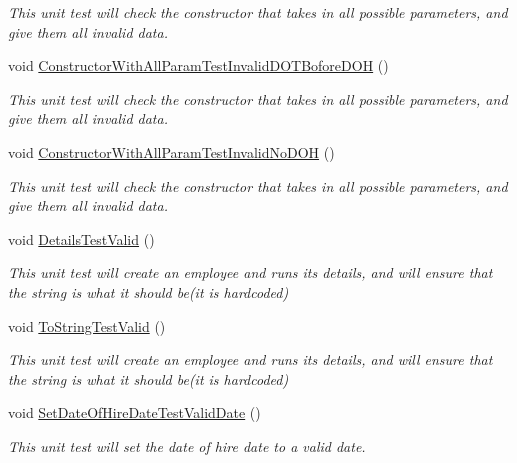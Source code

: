 \begin{DoxyCompactItemize}
\begin{DoxyCompactList}\small\item\em This unit test will check the constructor that takes in all possible parameters, and give them all invalid data. \end{DoxyCompactList}\item 
void \hyperlink{class_my_all_employee_1_1_tests_1_1_parttime_employee_tests_a36b5c50519f9866cab59de9204f00e91}{Constructor\+With\+All\+Param\+Test\+Invalid\+D\+O\+T\+Bofore\+D\+O\+H} ()
\begin{DoxyCompactList}\small\item\em This unit test will check the constructor that takes in all possible parameters, and give them all invalid data. \end{DoxyCompactList}\item 
void \hyperlink{class_my_all_employee_1_1_tests_1_1_parttime_employee_tests_acf0c1df829038c4ea3b2b4afd372bb48}{Constructor\+With\+All\+Param\+Test\+Invalid\+No\+D\+O\+H} ()
\begin{DoxyCompactList}\small\item\em This unit test will check the constructor that takes in all possible parameters, and give them all invalid data. \end{DoxyCompactList}\item 
void \hyperlink{class_my_all_employee_1_1_tests_1_1_parttime_employee_tests_a4c3a51bc9124ca9b76d227aa5a591e66}{Details\+Test\+Valid} ()
\begin{DoxyCompactList}\small\item\em This unit test will create an employee and runs it\textquotesingle{}s details, and will ensure that the string is what it should be(it is hardcoded) \end{DoxyCompactList}\item 
void \hyperlink{class_my_all_employee_1_1_tests_1_1_parttime_employee_tests_a93e1c4eaf3750132e8e60df585eb4be4}{To\+String\+Test\+Valid} ()
\begin{DoxyCompactList}\small\item\em This unit test will create an employee and runs it\textquotesingle{}s details, and will ensure that the string is what it should be(it is hardcoded) \end{DoxyCompactList}\item 
void \hyperlink{class_my_all_employee_1_1_tests_1_1_parttime_employee_tests_a0b68bd86c876d05b7823bdeaedef0112}{Set\+Date\+Of\+Hire\+Date\+Test\+Valid\+Date} ()
\begin{DoxyCompactList}\small\item\em This unit test will set the date of hire date to a valid date. \end{DoxyCompactList}\item 

\end{DoxyCompactItemize}
